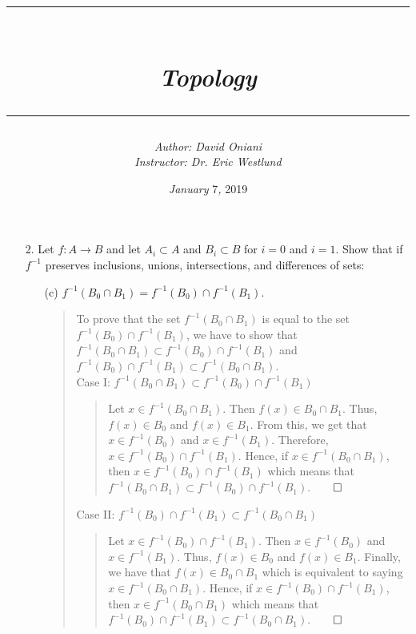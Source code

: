 \documentclass[12pt, a4paper]{article}
\title{\rule{\paperwidth - 150pt}{1pt}\textbf{\\\textit{Topology}\\}\rule{\paperwidth - 150pt}{1pt}}
\author
{
\textit{Author: David Oniani}
\\
\textit{Instructor: Dr. Eric Westlund}
}
\date{\textit{January }7\textit{, }2019}
\newcommand{\rarr}{\rightarrow}
\begin{document}
\maketitle


\begin{itemize}
\vspace{0.3cm}


\item[2.]
Let $f : A \rarr B$ and let $A_i \subset A$ and $B_i \subset B$
for $i = 0$ and $i = 1$. Show that if $f^{-1}$ preserves inclusions,
unions, intersections, and differences of sets:

\begin{itemize}
\item[(c)]
$f^{-1}(B_0 \cap B_1) = f^{-1}(B_0) \cap f^{-1}(B_1)$.
\vspace{0.25cm}

\begin{quote}
To prove that the set $f^{-1}(B_0 \cap B_1)$
is equal to the set $f^{-1}(B_0) \cap f^{-1}(B_1)$,
we have to show that $f^{-1}(B_0 \cap B_1) \subset f^{-1}(B_0) \cap f^{-1}(B_1)$
and $f^{-1}(B_0) \cap f^{-1}(B_1) \subset f^{-1}(B_0 \cap B_1)$.
\\
\vspace{0.5cm}
Case I: $f^{-1}(B_0 \cap B_1) \subset f^{-1}(B_0) \cap f^{-1}(B_1)$\\
\vspace{0.15cm}

\begin{quote}
Let $x \in f^{-1}(B_0 \cap B_1)$. Then $f(x) \in B_0 \cap B_1$. Thus, $f(x) \in B_0$
and $f(x) \in B_1$. From this, we get that $x \in f^{-1}(B_0)$ and $x \in f^{-1}(B_1)$.
Therefore, $x \in f^{-1}(B_0) \cap f^{-1}(B_1)$. Hence, if $x \in f^{-1}(B_0 \cap B_1)$,
then $x \in f^{-1}(B_0) \cap f^{-1}(B_1)$ which means that $f^{-1}(B_0 \cap B_1) \subset f^{-1}(B_0) \cap f^{-1}(B_1)$.$\qed$
\end{quote}

\vspace{0.5cm}
Case II: $f^{-1}(B_0) \cap f^{-1}(B_1) \subset f^{-1}(B_0 \cap B_1)$\\
\vspace{0.15cm}

\begin{quote}
Let $x \in f^{-1}(B_0) \cap f^{-1}(B_1)$. Then $x \in f^{-1}(B_0)$ and $x \in f^{-1}(B_1)$.
Thus, $f(x) \in B_0$ and $f(x) \in B_1$. Finally, we have that $f(x) \in B_0 \cap B_1$ which
is equivalent to saying $x \in f^{-1}(B_0 \cap B_1)$. Hence, if $x \in f^{-1}(B_0) \cap f^{-1}(B_1)$,
then $x \in f^{-1}(B_0 \cap B_1)$ which means that $f^{-1}(B_0) \cap f^{-1}(B_1) \subset f^{-1}(B_0 \cap B_1)$.$\qed$
\end{quote}
\vspace{0.5cm}


\end{quote}
\end{itemize}
\end{itemize}
\end{document}
